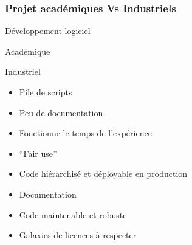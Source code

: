 \begin{frame}
  \frametitle{Projet académiques Vs Industriels}
  \begin{center}
    Développement logiciel
  \end{center}
  \begin{minipage}[c]{0.49\linewidth}
    \begin{center}
      Académique
      \newline
    \end{center}
  \end{minipage}\hfill
  \begin{minipage}[c]{0.49\linewidth}
    \begin{center}
      Industriel
      \newline
    \end{center}
  \end{minipage}\hfill
  \begin{minipage}[c]{0.49\linewidth}
    \begin{itemize}
    \item Pile de scripts
    \item Peu de documentation
    \item Fonctionne le temps de l'expérience
      \item ``Fair use''
    \end{itemize}
  \end{minipage}\hfill
  \vrule{}
  \begin{minipage}[c]{0.49\linewidth}
    \begin{itemize}
    \item Code hiérarchisé et déployable en production
    \item Documentation
    \item Code maintenable et robuste
    \item Galaxies de licences à respecter
    \end{itemize}
  \end{minipage}\hfill
\end{frame}

